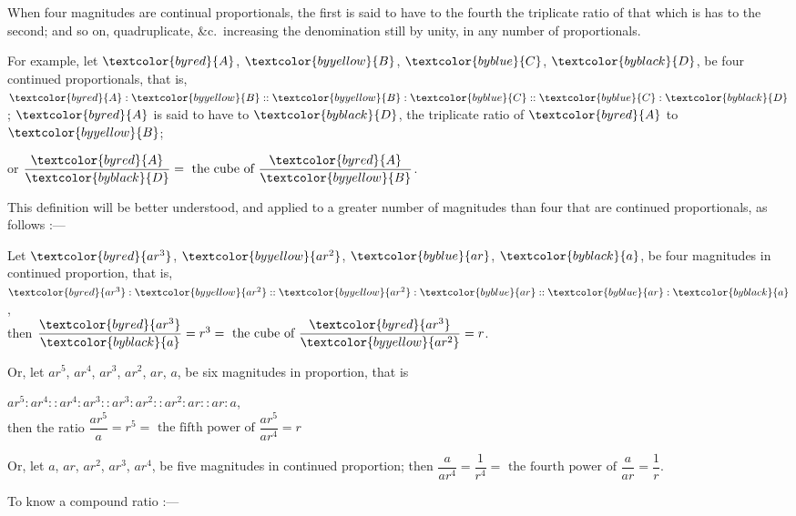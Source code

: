 \documentclass[booklanguage=english]{byrnebook}
\begin{document}
\vfill\pagebreak

\label{def:V.XI} 
\def\varA{\textcolor{byred}{A}}
\def\varB{\textcolor{byyellow}{B}}
\def\varC{\textcolor{byblue}{C}}
\def\varD{\textcolor{byblack}{D}}
\def\vararQ{\textcolor{byred}{ar^3}}
\def\vararS{\textcolor{byyellow}{ar^2}}
\def\varar{\textcolor{byblue}{ar}}
\def\vara{\textcolor{byblack}{a}}
When four magnitudes are continual proportionals, the first is said to have to the fourth the triplicate ratio of that which is has to the second; and so on, quadruplicate, \&c.\ increasing the denomination still by unity, in any number of proportionals.

For example, let $\varA$, $\varB$, $\varC$, $\varD$, be four continued proportionals, that is, $\varA : \varB :: \varB : \varC :: \varC : \varD$; $\varA$ is said to have to $\varD$, the triplicate ratio of $\varA$ to $\varB$;

\begin{center}
or $\dfrac{\varA}{\varD} = \mbox{ the cube of } \dfrac{\varA}{\varB}$.
\end{center}

This definition will be better understood, and applied to a greater number of magnitudes than four that are continued proportionals, as follows :—

\begin{center}
Let $\vararQ$, $\vararS$, $\varar$, $\vara$, be four magnitudes in continued proportion, that is, $\vararQ : \vararS :: \vararS : \varar :: \varar : \vara$,\\
then $\dfrac{\vararQ}{\vara} = r^3 = \mbox{ the cube of } \dfrac{\vararQ}{\vararS} = r$.
\end{center}

Or, let $ar^5$, $ar^4$, $ar^3$, $ar^2$, $ar$, $a$, be six magnitudes in proportion, that is

\begin{center}
$ar^5 : ar^4 :: ar^4 : ar^3 :: ar^3 : ar^2 :: ar^2 : ar :: ar : a$,\\
then the ratio $\dfrac{ar^5}{a} = r^5 = \mbox{ the fifth power of } \dfrac{ar^5}{ar^4} = r$
\end{center}

Or, let $a$, $ar$, $ar^2$, $ar^3$, $ar^4$, be five magnitudes in continued proportion; then $\dfrac{a}{ar^4} = \dfrac{1}{r^4} = \mbox{ the fourth power of } \dfrac{a}{ar} = \dfrac{1}{r}$.

\vfill\pagebreak

\label{def:V.A}
\def\varA{\textcolor{byred}{A}}
\def\varB{\textcolor{byred}{B}}
\def\varC{\textcolor{byred}{C}}
\def\varD{\textcolor{byred}{D}}
\def\varE{\textcolor{byblue}{E}}
\def\varF{\textcolor{byblue}{F}}
\def\varG{\textcolor{byblue}{G}}
\def\varH{\textcolor{byblue}{H}}
\def\varK{\textcolor{byblue}{K}}
\def\varL{\textcolor{byblue}{L}}
\def\varM{\textcolor{byyellow}{M}}
\def\varN{\textcolor{byyellow}{N}}
To know a compound ratio :—
\end{document}
